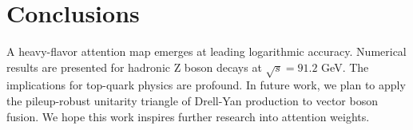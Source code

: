 \section{Conclusions}\label{sec:conclusions}

A heavy-flavor attention map emerges at leading logarithmic accuracy.
Numerical results are presented for hadronic Z boson decays at $\sqrt{s}
= 91.2$ GeV. The implications for top-quark physics are profound. In
future work, we plan to apply the pileup-robust unitarity triangle of
Drell-Yan production to vector boson fusion. We hope this work inspires
further research into attention weights.

